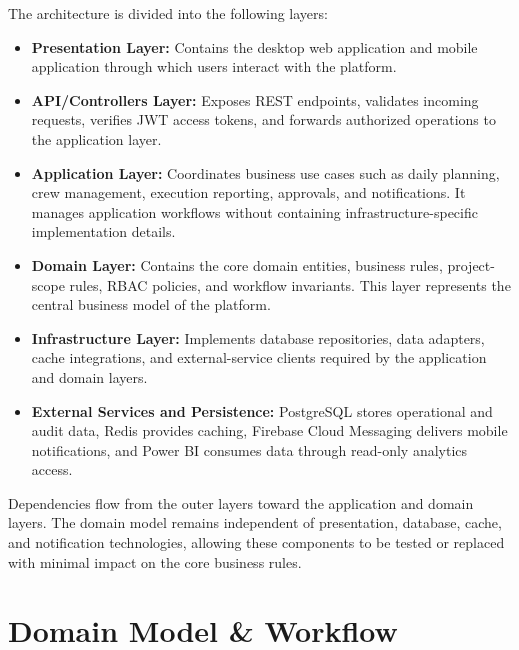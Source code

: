 \documentclass[11pt]{article}
\begin{document}
The architecture is divided into the following layers:

\begin{itemize}
    \item \textbf{Presentation Layer:} Contains the desktop web application and
          mobile application through which users interact with the platform.

    \item \textbf{API/Controllers Layer:} Exposes REST endpoints, validates
          incoming requests, verifies JWT access tokens, and forwards authorized
          operations to the application layer.

    \item \textbf{Application Layer:} Coordinates business use cases such as
          daily planning, crew management, execution reporting, approvals, and
          notifications. It manages application workflows without containing
          infrastructure-specific implementation details.

    \item \textbf{Domain Layer:} Contains the core domain entities, business
          rules, project-scope rules, RBAC policies, and workflow invariants.
          This layer represents the central business model of the platform.

    \item \textbf{Infrastructure Layer:} Implements database repositories, data
          adapters, cache integrations, and external-service clients required by
          the application and domain layers.

    \item \textbf{External Services and Persistence:} PostgreSQL stores
          operational and audit data, Redis provides caching, Firebase Cloud
          Messaging delivers mobile notifications, and Power BI consumes data
          through read-only analytics access.
\end{itemize}

Dependencies flow from the outer layers toward the application and domain
layers. The domain model remains independent of presentation, database, cache,
and notification technologies, allowing these components to be tested or
replaced with minimal impact on the core business rules.

\clearpage
\begingroup
\setlength{\parskip}{0.45\baselineskip}
\section{Domain Model \& Workflow}
\end{document}
